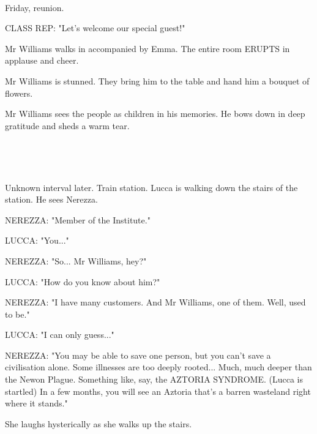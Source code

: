 \documentclass[11pt]{article}
\begin{document}
\ 

Friday, reunion.

CLASS REP: "Let's welcome our special guest!"

Mr Williams walks in accompanied by Emma.
The entire room ERUPTS in applause and cheer.

Mr Williams is stunned.
They bring him to the table and hand him a bouquet of flowers.

Mr Williams sees the people as children in his memories.
He bows down in deep gratitude and sheds a warm tear.

\ 

\ 

Unknown interval later.
Train station.
Lucca is walking down the stairs of the station.
He sees Nerezza. 

NEREZZA: "Member of the Institute."

LUCCA: "You..."

NEREZZA: "So... Mr Williams, hey?"

LUCCA: "How do you know about him?"

NEREZZA: "I have many customers. 
And Mr Williams, one of them.
Well, used to be."

LUCCA: "I can only guess..."

NEREZZA: "You may be able to save one person, but you can't save a civilisation alone.
Some illnesses are too deeply rooted... Much, much deeper than the Newon Plague.
Something like, say, the AZTORIA SYNDROME. (Lucca is startled)
In a few months, you will see an Aztoria that's a barren wasteland right where it stands."

She laughs hysterically as she walks up the stairs.
\end{document}
